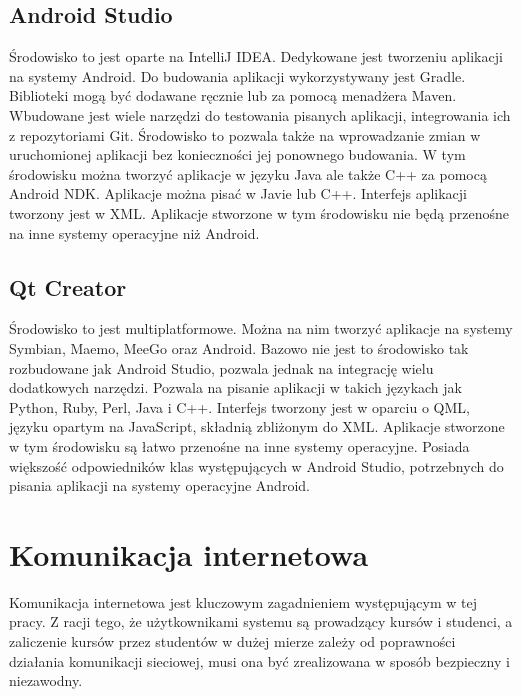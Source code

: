 \documentclass[eng]{mgr}
\begin{document}
			\subsection{Android Studio}
			Środowisko to jest oparte na IntelliJ IDEA. Dedykowane jest tworzeniu aplikacji na systemy Android. Do budowania aplikacji wykorzystywany jest Gradle. Biblioteki mogą być dodawane ręcznie lub za pomocą menadżera Maven. Wbudowane jest wiele narzędzi do testowania pisanych aplikacji, integrowania ich z repozytoriami Git. Środowisko to pozwala także na wprowadzanie zmian w uruchomionej aplikacji bez konieczności jej ponownego budowania. W tym środowisku można tworzyć aplikacje w języku Java ale także C++ za pomocą Android NDK. Aplikacje można pisać w Javie lub C++. Interfejs aplikacji tworzony jest w XML. Aplikacje stworzone w tym środowisku nie będą przenośne na inne systemy operacyjne niż Android.
			
			\subsection{Qt Creator}
			Środowisko to jest multiplatformowe. Można na nim tworzyć aplikacje na systemy Symbian, Maemo, MeeGo oraz Android. Bazowo nie jest to środowisko tak rozbudowane jak Android Studio, pozwala jednak na integrację wielu dodatkowych narzędzi. Pozwala na pisanie aplikacji w takich językach jak Python, Ruby, Perl, Java i C++. Interfejs tworzony jest w oparciu o QML, języku opartym na JavaScript, składnią zbliżonym do XML. Aplikacje stworzone w tym środowisku są łatwo przenośne na inne systemy operacyjne. Posiada większość odpowiedników klas występujących w Android Studio, potrzebnych do pisania aplikacji na systemy operacyjne Android.
	
		\section{Komunikacja internetowa}
		Komunikacja internetowa jest kluczowym zagadnieniem występującym w tej pracy. Z racji tego, że użytkownikami systemu są prowadzący kursów i studenci, a zaliczenie kursów przez studentów w dużej mierze zależy od poprawności działania komunikacji sieciowej, musi ona być zrealizowana w sposób bezpieczny i niezawodny.
		
\end{document}
